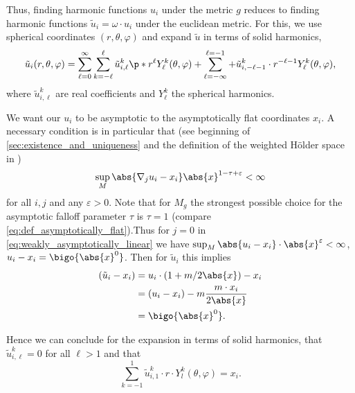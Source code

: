 \documentclass[titlepage,numbers=noenddot,headinclude,oneside,%
footinclude=true,cleardoublepage=empty,%
BCOR=5mm,paper=a4,fontsize=11pt,%
english,%
]{scrartcl}
\begin{document}
Thus, finding harmonic functions \( u_i \) under the metric \( g \) reduces to finding harmonic functions \( \tilde{u}_i=\omega \cdot u_i \) under the euclidean metric. For this, we use spherical coordinates \( (r,\theta,\varphi) \) and expand \( \tilde{u} \) in terms of solid harmonics,
\begin{equation*}
    \tilde{u}_i(r,\theta,\varphi)=\sum_{\ell=0}^\infty \sum_{k=-\ell}^\ell \tilde{u}^k_{i,\ell} \p*{r^\ell Y^k_{\ell}(\theta,\varphi)+\sum_{\ell=-\infty}^{\ell=-1}+ \tilde{u}^k_{i,-\ell-1}\cdot r^{-\ell-1}Y^k_{\ell}(\theta,\varphi)},
\end{equation*}
where \( \tilde{u}^k_{i,\ell} \) are real coefficients and \( Y^k_{\ell} \) the spherical harmonics.

We want our \( u_i \) to be asymptotic to the asymptotically flat coordinates \( x_i \). A necessary condition is in particular that (see beginning of \cref{sec:existence_and_uniqueness} and the definition of the weighted Hölder space in \cite[Section 3]{almarazPositiveMassTheorem2016})
\begin{equation*}\label{eq:weakly_asymptotically_linear}
    \sup_M \abs{\nabla_j u_i-x_i} \abs{x}^{1-\tau+\varepsilon}<\infty
\end{equation*}
for all \( i,j \) and any \( \varepsilon>0 \). Note that for \( M_g \) the strongest possible choice for the asymptotic falloff parameter \( \tau \) is \( \tau=1 \) (compare \cref{eq:def_asymptotically_flat}).Thus for \( j=0 \) in \cref{eq:weakly_asymptotically_linear} we have \( \sup_M \abs{u_i-x_i}\cdot \abs{x}^\varepsilon<\infty \), \ie \( u_i-x_i=\bigo{\abs{x}^0} \). Then for \( \tilde{u}_i \) this implies
\begin{equation*}
    \begin{aligned}[t]
        (\tilde{u}_i-x_i)&=u_i\cdot (1+m/2\abs{x})-x_i\\
        &=(u_i-x_i)-m\frac{m\cdot x_i}{2\abs{x}}\\
        &=\bigo{\abs{x}^0}.
    \end{aligned}
\end{equation*}

Hence we can conclude for the expansion in terms of solid harmonics, that \( \tilde{u}^k_{i,\ell}=0 \) for all \( \ell>1 \) and that
\begin{equation}
    \sum_{k=-1}^1 \tilde{u}^k_{i,1}\cdot r \cdot Y^k_l(\theta,\varphi)=x_i.\label{eq:schwarzschld_harmonic_linear_part}
\end{equation}
\end{document}
